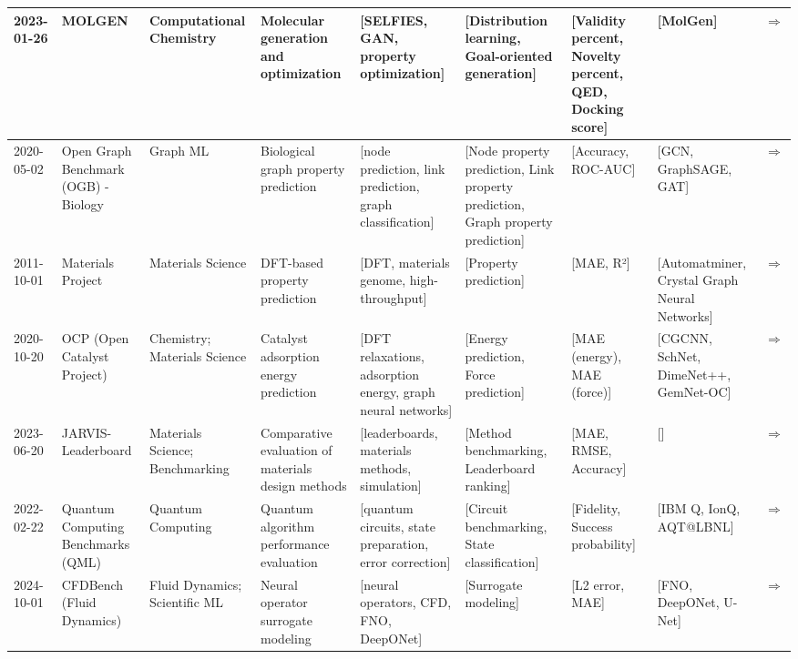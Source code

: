 \documentclass{article}
\begin{document}
\begin{landscape}
{\begin{longtable}{|p{1.5cm}|p{2.5cm}|p{2cm}|p{2cm}|p{2.5cm}|p{3cm}|p{2cm}|p{2cm}|p{1cm}|}
2023-01-26 & MOLGEN & Computational Chemistry & Molecular generation and optimization & [SELFIES, GAN, property optimization] & [Distribution learning, Goal-oriented generation] & [Validity percent, Novelty percent, QED, Docking score] & [MolGen] & \cite{fang2023domain} \href{https://arxiv.org/abs/2301.11259}{$\Rightarrow$ } \\ \hline
2020-05-02 & Open Graph Benchmark (OGB) - Biology & Graph ML & Biological graph property prediction & [node prediction, link prediction, graph classification] & [Node property prediction, Link property prediction, Graph property prediction] & [Accuracy, ROC-AUC] & [GCN, GraphSAGE, GAT] & \cite{hu2020ogb} \href{https://arxiv.org/abs/2005.00687}{$\Rightarrow$ } \\ \hline
2011-10-01 & Materials Project & Materials Science & DFT-based property prediction & [DFT, materials genome, high-throughput] & [Property prediction] & [MAE, R²] & [Automatminer, Crystal Graph Neural Networks] & \cite{jain2013materials} \href{https://materialsproject.org/}{$\Rightarrow$ } \\ \hline
2020-10-20 & OCP (Open Catalyst Project) & Chemistry; Materials Science & Catalyst adsorption energy prediction & [DFT relaxations, adsorption energy, graph neural networks] & [Energy prediction, Force prediction] & [MAE (energy), MAE (force)] & [CGCNN, SchNet, DimeNet++, GemNet-OC] & \cite{chanussot2021oc20, tran2023oc22, doi:10.1021/acscatal.0c04525, tran2023b} \href{https://pubs.acs.org/doi/10.1021/acscatal.0c04525}{$\Rightarrow$ } \\ \hline
2023-06-20 & JARVIS-Leaderboard & Materials Science; Benchmarking & Comparative evaluation of materials design methods & [leaderboards, materials methods, simulation] & [Method benchmarking, Leaderboard ranking] & [MAE, RMSE, Accuracy] & [] & \cite{choudhary2024jarvis} \href{https://doi.org/10.1038/s41524-024-01259-w}{$\Rightarrow$ } \\ \hline
2022-02-22 & Quantum Computing Benchmarks (QML) & Quantum Computing & Quantum algorithm performance evaluation & [quantum circuits, state preparation, error correction] & [Circuit benchmarking, State classification] & [Fidelity, Success probability] & [IBM Q, IonQ, AQT@LBNL] & \cite{kiwit2023} \href{http://dx.doi.org/10.1109/QCE57702.2023.00061}{$\Rightarrow$ } \\ \hline
2024-10-01 & CFDBench (Fluid Dynamics) & Fluid Dynamics; Scientific ML & Neural operator surrogate modeling & [neural operators, CFD, FNO, DeepONet] & [Surrogate modeling] & [L2 error, MAE] & [FNO, DeepONet, U-Net] & \cite{luo2024cfdbenchlargescalebenchmarkmachine} \href{https://arxiv.org/abs/2310.05963}{$\Rightarrow$ } \\ \hline

\end{longtable}}
\end{landscape}
\end{document}
